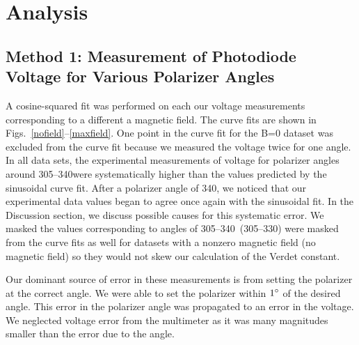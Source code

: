 \documentclass[prb,preprint]{revtex4-1}
\begin{document}
\section{Analysis}
{\subsection{Method 1: Measurement of Photodiode Voltage for Various Polarizer Angles}
{A cosine-squared fit was performed on each our voltage measurements corresponding to a different a magnetic field. The curve fits are shown in Figs.~\ref{nofield}--\ref{maxfield}.  One point in the curve fit for the B=0 dataset was excluded from the curve fit because we measured the voltage twice for one angle. In all data sets, the experimental measurements of voltage for polarizer angles around 305\degree--340\degree were systematically higher than the values predicted by the sinusoidal curve fit. After a polarizer angle of 340\degree, we noticed that our experimental data values began to agree once again with the sinusoidal fit.  In the Discussion section, we discuss possible causes for this systematic error. We masked the values corresponding to angles of 305\degree--340\degree\ (305\degree--330\degree) were masked from the curve fits as well for datasets with a nonzero magnetic field (no magnetic field) so they would not skew our calculation of the Verdet constant.

Our dominant source of error in these measurements is from setting the polarizer at the correct angle. We were able to set the polarizer within $1\degree$ of the desired angle. This error in the polarizer angle was propagated to an error in the voltage. We neglected voltage error from the multimeter as it was many magnitudes smaller than the error due to the angle.

}}
\end{document}
